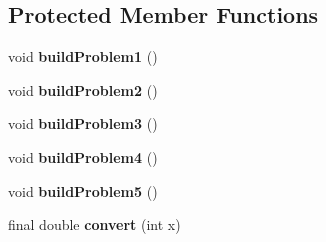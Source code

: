\subsection*{Protected Member Functions}
\begin{DoxyCompactItemize}
\item 
\hypertarget{classjenes_1_1performance_1_1_de_jong_test_acd3c1b93304e2d46f53891a2bf82bf8b}{void {\bfseries build\-Problem1} ()}\label{classjenes_1_1performance_1_1_de_jong_test_acd3c1b93304e2d46f53891a2bf82bf8b}

\item 
\hypertarget{classjenes_1_1performance_1_1_de_jong_test_ad444e70d87a8a65d868a08f836ddca44}{void {\bfseries build\-Problem2} ()}\label{classjenes_1_1performance_1_1_de_jong_test_ad444e70d87a8a65d868a08f836ddca44}

\item 
\hypertarget{classjenes_1_1performance_1_1_de_jong_test_a04ba560b3c32b954db4b0e2de7e0fea3}{void {\bfseries build\-Problem3} ()}\label{classjenes_1_1performance_1_1_de_jong_test_a04ba560b3c32b954db4b0e2de7e0fea3}

\item 
\hypertarget{classjenes_1_1performance_1_1_de_jong_test_a1dd8d7b4740a0f65699bac3b7c64cebf}{void {\bfseries build\-Problem4} ()}\label{classjenes_1_1performance_1_1_de_jong_test_a1dd8d7b4740a0f65699bac3b7c64cebf}

\item 
\hypertarget{classjenes_1_1performance_1_1_de_jong_test_ad1282e40a9a1711898f700f17f90bcb0}{void {\bfseries build\-Problem5} ()}\label{classjenes_1_1performance_1_1_de_jong_test_ad1282e40a9a1711898f700f17f90bcb0}

\item 
\hypertarget{classjenes_1_1performance_1_1_de_jong_test_afd03d3c06d2c0a3ff64a384413e1c1fd}{final double {\bfseries convert} (int x)}\label{classjenes_1_1performance_1_1_de_jong_test_afd03d3c06d2c0a3ff64a384413e1c1fd}

\end{DoxyCompactItemize}
